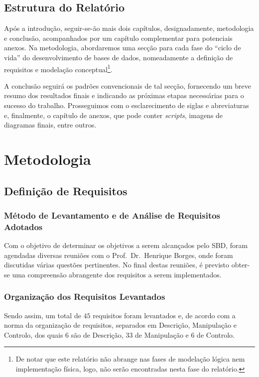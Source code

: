 \documentclass[a4paper,12pt]{scrreprt}
\begin{document}
    \section{Estrutura do Relatório}

    Após a introdução, seguir-se-ão mais dois capítulos, designadamente, metodologia e conclusão,
    acompanhados por um capítulo complementar para potenciais anexos.
    Na metodologia, abordaremos uma secção para cada fase do ``ciclo de vida'' do desenvolvimento de bases de dados,
    nomeadamente a definição de requisitos e modelação conceptual\footnote{De notar que este relat\'orio n\~ao abrange nas fases de modela\c{c}\~ao
        l\'ogica nem implementa\c{c}\~ao f\'isica, logo, n\~ao ser\~ao encontradas nesta fase do relat\'orio.}.
        
    A conclusão seguirá os padrões convencionais de tal secção, fornecendo um breve
    resumo dos resultados finais e indicando as próximas etapas necessárias para o sucesso do trabalho.
    Prosseguimos com o esclarecimento de siglas e abreviaturas e, finalmente, o capítulo de anexos,
    que pode conter \textit{scripts}, imagens de diagramas finais, entre outros.
        
\chapter{Metodologia}
    \section{Defini\c{c}\~ao de Requisitos}
        \subsection{M\'etodo de Levantamento e de An\'alise de Requisitos Adotados}
        Com o objetivo de determinar os objetivos a serem alcançados pelo SBD,
        foram agendadas diversas reuniões com o Prof.\ Dr.\ Henrique Borges, onde foram discutidas
        várias questões pertinentes. No final destas reuniões, é previsto obter-se uma compreensão
        abrangente dos requisitos a serem implementados.
        \subsection{Organiza\c{c}\~ao dos Requisitos Levantados}
        Sendo assim, um total de $45$ requisitos foram levantados e,
        de acordo com a norma da organização de requisitos, separados em Descrição,
        Manipulação e Controlo, dos quais $6$ são de Descrição, $33$ de Manipulação e
        $6$ de Controlo.
        \newpage
\end{document}
